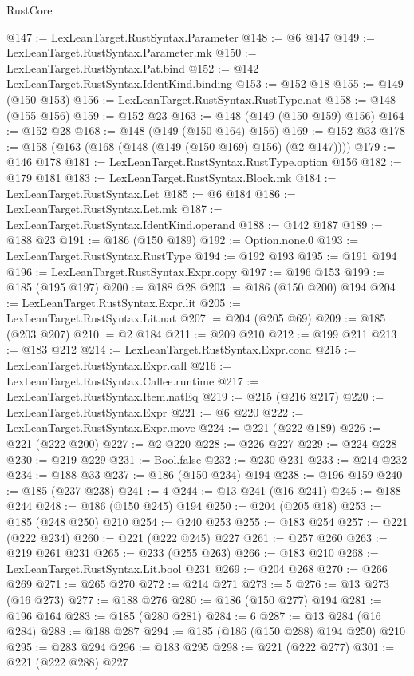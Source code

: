 \begin{lexlean}{RustCore}
\begin{coremodule}
@147 := LexLeanTarget.RustSyntax.Parameter
@148 := @6 @147
@149 := LexLeanTarget.RustSyntax.Parameter.mk
@150 := LexLeanTarget.RustSyntax.Pat.bind
@152 := @142 LexLeanTarget.RustSyntax.IdentKind.binding
@153 := @152 @18
@155 := @149 (@150 @153)
@156 := LexLeanTarget.RustSyntax.RustType.nat
@158 := @148 (@155 @156)
@159 := @152 @23
@163 := @148 (@149 (@150 @159) @156)
@164 := @152 @28
@168 := @148 (@149 (@150 @164) @156)
@169 := @152 @33
@178 := @158 (@163 (@168 (@148 (@149 (@150 @169) @156) (@2 @147))))
@179 := @146 @178
@181 := LexLeanTarget.RustSyntax.RustType.option @156
@182 := @179 @181
@183 := LexLeanTarget.RustSyntax.Block.mk
@184 := LexLeanTarget.RustSyntax.Let
@185 := @6 @184
@186 := LexLeanTarget.RustSyntax.Let.mk
@187 := LexLeanTarget.RustSyntax.IdentKind.operand
@188 := @142 @187
@189 := @188 @23
@191 := @186 (@150 @189)
@192 := Option.none.{0}
@193 := LexLeanTarget.RustSyntax.RustType
@194 := @192 @193
@195 := @191 @194
@196 := LexLeanTarget.RustSyntax.Expr.copy
@197 := @196 @153
@199 := @185 (@195 @197)
@200 := @188 @28
@203 := @186 (@150 @200) @194
@204 := LexLeanTarget.RustSyntax.Expr.lit
@205 := LexLeanTarget.RustSyntax.Lit.nat
@207 := @204 (@205 @69)
@209 := @185 (@203 @207)
@210 := @2 @184
@211 := @209 @210
@212 := @199 @211
@213 := @183 @212
@214 := LexLeanTarget.RustSyntax.Expr.cond
@215 := LexLeanTarget.RustSyntax.Expr.call
@216 := LexLeanTarget.RustSyntax.Callee.runtime
@217 := LexLeanTarget.RustSyntax.Item.natEq
@219 := @215 (@216 @217)
@220 := LexLeanTarget.RustSyntax.Expr
@221 := @6 @220
@222 := LexLeanTarget.RustSyntax.Expr.move
@224 := @221 (@222 @189)
@226 := @221 (@222 @200)
@227 := @2 @220
@228 := @226 @227
@229 := @224 @228
@230 := @219 @229
@231 := Bool.false
@232 := @230 @231
@233 := @214 @232
@234 := @188 @33
@237 := @186 (@150 @234) @194
@238 := @196 @159
@240 := @185 (@237 @238)
@241 := 4
@244 := @13 @241 (@16 @241)
@245 := @188 @244
@248 := @186 (@150 @245) @194
@250 := @204 (@205 @18)
@253 := @185 (@248 @250) @210
@254 := @240 @253
@255 := @183 @254
@257 := @221 (@222 @234)
@260 := @221 (@222 @245) @227
@261 := @257 @260
@263 := @219 @261 @231
@265 := @233 (@255 @263)
@266 := @183 @210
@268 := LexLeanTarget.RustSyntax.Lit.bool @231
@269 := @204 @268
@270 := @266 @269
@271 := @265 @270
@272 := @214 @271
@273 := 5
@276 := @13 @273 (@16 @273)
@277 := @188 @276
@280 := @186 (@150 @277) @194
@281 := @196 @164
@283 := @185 (@280 @281)
@284 := 6
@287 := @13 @284 (@16 @284)
@288 := @188 @287
@294 := @185 (@186 (@150 @288) @194 @250) @210
@295 := @283 @294
@296 := @183 @295
@298 := @221 (@222 @277)
@301 := @221 (@222 @288) @227

\end{coremodule}
\end{lexlean}
